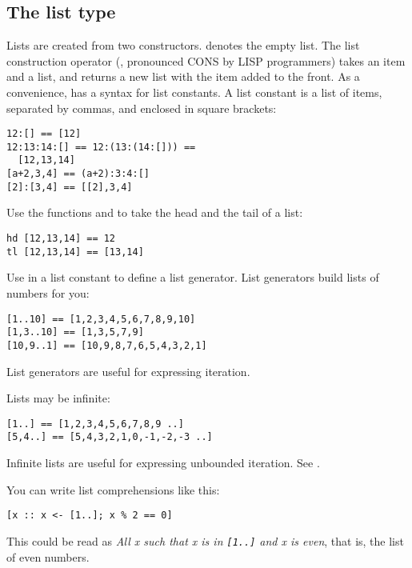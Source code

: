 \subsection{The list type}

Lists are created from two constructors. \ct{[]} denotes the empty list. The
list construction operator (\ct{:}, pronounced CONS by LISP programmers) takes
an item and a list, and returns a new list with the item added to the front.
As a convenience, \nip{} has a syntax for list constants. A list constant is a
list of items, separated by commas, and enclosed in square brackets:

\begin{verbatim}
12:[] == [12]
12:13:14:[] == 12:(13:(14:[])) == 
  [12,13,14]
[a+2,3,4] == (a+2):3:4:[]
[2]:[3,4] == [[2],3,4]
\end{verbatim}

Use the functions  and  to take the head and the
tail of a list:

\begin{verbatim}
hd [12,13,14] == 12
tl [12,13,14] == [13,14]
\end{verbatim}

Use  in a list constant to define a list generator. List generators
build lists of numbers for you:

\begin{verbatim}
[1..10] == [1,2,3,4,5,6,7,8,9,10]
[1,3..10] == [1,3,5,7,9]
[10,9..1] == [10,9,8,7,6,5,4,3,2,1]
\end{verbatim}

\noindent
List generators are useful for expressing iteration. 

Lists may be infinite:

\begin{verbatim}
[1..] == [1,2,3,4,5,6,7,8,9 ..]
[5,4..] == [5,4,3,2,1,0,-1,-2,-3 ..]
\end{verbatim}

\noindent
Infinite lists are useful for expressing unbounded iteration.
See .

You can write list comprehensions like this:

\begin{verbatim}
[x :: x <- [1..]; x % 2 == 0]
\end{verbatim}

\noindent
This could be read as {\em All x such that x is in \verb+[1..]+ and x is
even}, that is, the list of even numbers.

